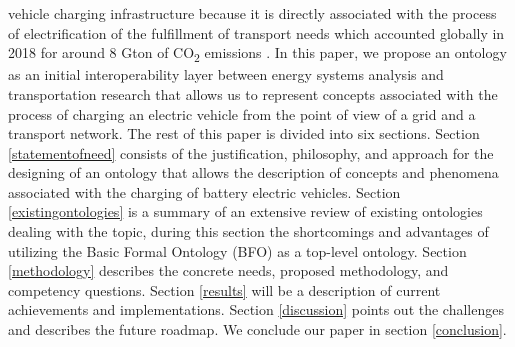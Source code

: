vehicle charging infrastructure because it is directly associated with the
process of electrification of the fulfillment of transport needs which accounted
globally in 2018 for around 8 Gton of CO\textsubscript{2} emissions
\cite{IEA.2023}. In this paper, we propose an ontology as an initial
interoperability layer between energy systems analysis and transportation
research that allows us to represent concepts associated with the process of
charging an electric vehicle from the point of view of a grid and a transport
network. The rest of this paper is divided into six sections. Section
\ref{statementofneed} consists of the justification, philosophy, and approach
for the designing of an ontology that allows the description of concepts and
phenomena associated with the charging of battery electric vehicles. Section
\ref{existingontologies} is a summary of an extensive review of existing
ontologies dealing with the topic, during this section the shortcomings and
advantages of utilizing the Basic Formal Ontology (BFO) \cite{Arp.2015} as a
top-level ontology. Section \ref{methodology} describes the concrete needs,
proposed methodology, and competency questions. Section \ref{results} will be a
description of current achievements and implementations. Section
\ref{discussion} points out the challenges and describes the future roadmap. We
conclude our paper in section \ref{conclusion}.

